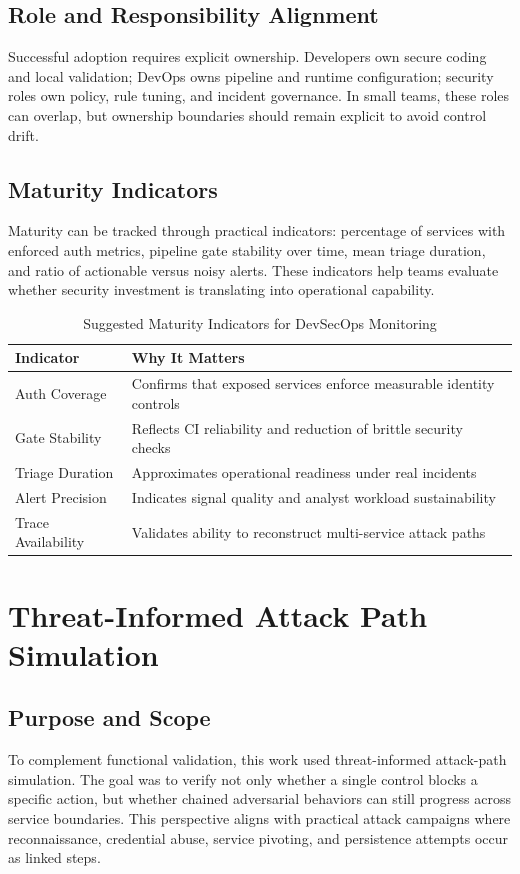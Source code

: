 \documentclass[conference]{IEEEtran}
\begin{document}
\subsection{Role and Responsibility Alignment}
Successful adoption requires explicit ownership. Developers own secure coding and local validation; DevOps owns pipeline and runtime configuration; security roles own policy, rule tuning, and incident governance. In small teams, these roles can overlap, but ownership boundaries should remain explicit to avoid control drift.

\subsection{Maturity Indicators}
Maturity can be tracked through practical indicators: percentage of services with enforced auth metrics, pipeline gate stability over time, mean triage duration, and ratio of actionable versus noisy alerts. These indicators help teams evaluate whether security investment is translating into operational capability.

\begin{table}[!t]
\caption{Suggested Maturity Indicators for DevSecOps Monitoring}
\centering
\footnotesize
\begin{tabularx}{\linewidth}{>{\raggedright\arraybackslash}p{1.3cm} Y}
\toprule
Indicator & Why It Matters \\
\midrule
Auth Coverage & Confirms that exposed services enforce measurable identity controls \\
Gate Stability & Reflects CI reliability and reduction of brittle security checks \\
Triage Duration & Approximates operational readiness under real incidents \\
Alert Precision & Indicates signal quality and analyst workload sustainability \\
Trace Availability & Validates ability to reconstruct multi-service attack paths \\
\bottomrule
\end{tabularx}
\label{tab:maturity}
\end{table}

\section{Threat-Informed Attack Path Simulation}
\subsection{Purpose and Scope}
To complement functional validation, this work used threat-informed attack-path simulation. The goal was to verify not only whether a single control blocks a specific action, but whether chained adversarial behaviors can still progress across service boundaries. This perspective aligns with practical attack campaigns where reconnaissance, credential abuse, service pivoting, and persistence attempts occur as linked steps.
\end{document}
